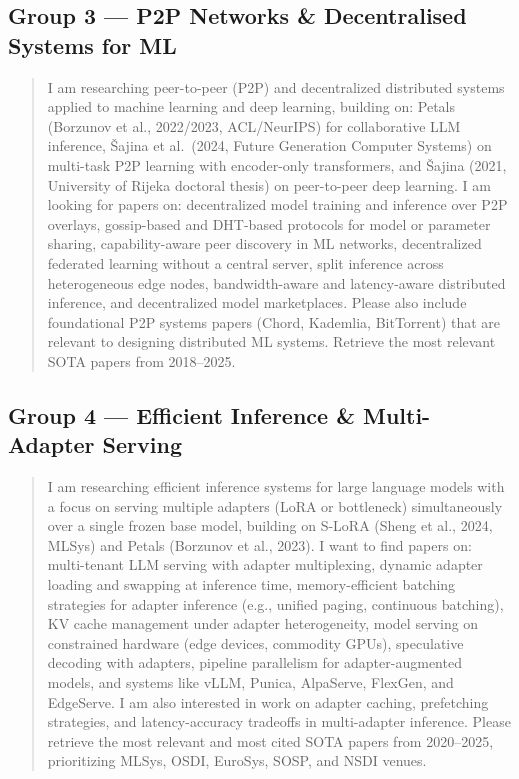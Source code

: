 \subsection*{Group 3 — P2P Networks \& Decentralised Systems for ML}
\label{app:undermind:g3}

\begin{quote}\small
I am researching peer-to-peer (P2P) and decentralized distributed systems applied to
machine learning and deep learning, building on: Petals (Borzunov et al., 2022/2023,
ACL/NeurIPS) for collaborative LLM inference, \v{S}ajina et al.\ (2024, Future
Generation Computer Systems) on multi-task P2P learning with encoder-only
transformers, and \v{S}ajina (2021, University of Rijeka doctoral thesis) on
peer-to-peer deep learning. I am looking for papers on: decentralized model training
and inference over P2P overlays, gossip-based and DHT-based protocols for model or
parameter sharing, capability-aware peer discovery in ML networks, decentralized
federated learning without a central server, split inference across heterogeneous edge
nodes, bandwidth-aware and latency-aware distributed inference, and decentralized
model marketplaces. Please also include foundational P2P systems papers (Chord,
Kademlia, BitTorrent) that are relevant to designing distributed ML systems. Retrieve
the most relevant SOTA papers from 2018--2025.
\end{quote}

\subsection*{Group 4 — Efficient Inference \& Multi-Adapter Serving}
\label{app:undermind:g4}

\begin{quote}\small
I am researching efficient inference systems for large language models with a focus
on serving multiple adapters (LoRA or bottleneck) simultaneously over a single frozen
base model, building on S-LoRA (Sheng et al., 2024, MLSys) and Petals (Borzunov
et al., 2023). I want to find papers on: multi-tenant LLM serving with adapter
multiplexing, dynamic adapter loading and swapping at inference time, memory-efficient
batching strategies for adapter inference (e.g., unified paging, continuous batching),
KV cache management under adapter heterogeneity, model serving on constrained hardware
(edge devices, commodity GPUs), speculative decoding with adapters, pipeline
parallelism for adapter-augmented models, and systems like vLLM, Punica, AlpaServe,
FlexGen, and EdgeServe. I am also interested in work on adapter caching, prefetching
strategies, and latency-accuracy tradeoffs in multi-adapter inference. Please retrieve
the most relevant and most cited SOTA papers from 2020--2025, prioritizing MLSys,
OSDI, EuroSys, SOSP, and NSDI venues.
\end{quote}

